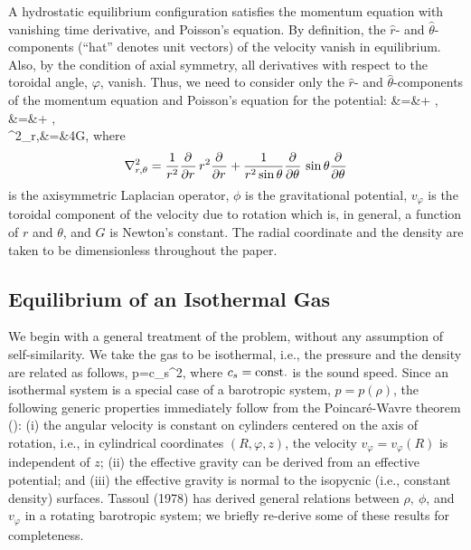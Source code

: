 A hydrostatic equilibrium configuration satisfies the momentum equation with
vanishing time derivative, and Poisson's equation. By definition, the 
$\hat r$- and $\hat\theta$-components (``hat'' denotes unit vectors) of the 
velocity vanish in equilibrium. Also, by the condition of axial symmetry, all 
derivatives with respect to the toroidal angle, $\varphi$, vanish. Thus, 
we need to consider only the $\hat{r}$- and $\hat{\theta}$-components 
of the momentum equation and Poisson's equation for the potential:
\bml
\bea
{}&=&+ ,
\label{mom-r}\\
&=&\pd{\rho}{\theta}{}+
\pd{\phi}{\theta}{} ,
\label{mom-theta}\\
\nabla^2_{r,\theta}\;\phi&=&4\pi G\rho ,
\label{Poisson}
\eea
\eml
where 
$$
\nabla^2_{r,\theta}=\frac{1}{r^2}\frac{\partial^{}{}}{\partial {r}^{}}\,r^2\frac{\partial^{}{}}{\partial {r}^{}}+
\frac{1}{r^2\sin\theta}\frac{\partial^{}{}}{\partial {\theta}^{}}\,\sin\theta\frac{\partial^{}{}}{\partial {\theta}^{}}
$$
is the axisymmetric Laplacian operator,
$\phi$ is the gravitational potential, $v_\varphi$ is the toroidal 
component of the velocity due to rotation which is, in general, a function 
of $r$ and $\theta$, and $G$ is Newton's constant. The radial coordinate and
the density are taken to be dimensionless throughout the paper. 

\subsection{Equilibrium of an Isothermal Gas}

We begin with a general treatment of the problem, without any assumption of 
self-similarity. We take the gas to be isothermal, i.e.,
the pressure and the density are related as follows,
\beq
p=c_s^2\rho ,
\label{p}
\eeq
where $c_s={\rm const.}$ is the sound speed. Since an isothermal
system is a special case of a barotropic system, $p=p(\rho)$,
the following generic properties immediately follow from the Poincar\'e-Wavre
theorem (\cite{Tassoul}): (i) the angular velocity is constant on
cylinders centered on the axis of rotation, i.e., in cylindrical
coordinates $(R,\varphi,z)$, the velocity $v_\varphi=v_\varphi(R)$ is
independent of $z$; (ii) the effective gravity can be derived from an effective
potential; and (iii) the effective gravity is normal to the isopycnic (i.e.,
constant density) surfaces. Tassoul (1978) has derived general relations 
between $\rho,\ \phi$, and $v_\varphi$ in a rotating barotropic system;
we briefly re-derive some of these results for completeness.

